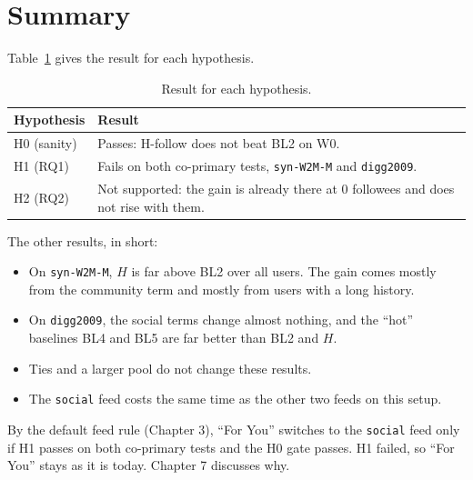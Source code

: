 \section{Summary}
\label{sec:results-summary}

Table~\ref{tab:results-summary} gives the result for each hypothesis.

\begin{table}[htbp]
  \centering
  \caption{Result for each hypothesis.}
  \label{tab:results-summary}
  \small
  \begin{tabular}{@{}lp{}@{}}
    \toprule
    Hypothesis & Result \\
    \midrule
    H0 (sanity) & Passes: H-follow does not beat BL2 on W0. \\
    H1 (RQ1) & Fails on both co-primary tests, \texttt{syn-W2M-M} and \texttt{digg2009}. \\
    H2 (RQ2) & Not supported: the gain is already there at 0 followees and does not rise with them. \\
    \bottomrule
  \end{tabular}
\end{table}

The other results, in short:
\begin{itemize}
  \item On \texttt{syn-W2M-M}, $H$ is far above BL2 over all users. The gain comes mostly from the community term and mostly from users with a long history.
  \item On \texttt{digg2009}, the social terms change almost nothing, and the ``hot'' baselines BL4 and BL5 are far better than BL2 and $H$.
  \item Ties and a larger pool do not change these results.
  \item The \texttt{social} feed costs the same time as the other two feeds on this setup.
\end{itemize}

By the default feed rule (Chapter 3), ``For You'' switches to the \texttt{social} feed only if H1 passes on both co-primary tests and the H0 gate passes. H1 failed, so ``For You'' stays as it is today. Chapter 7 discusses why.
